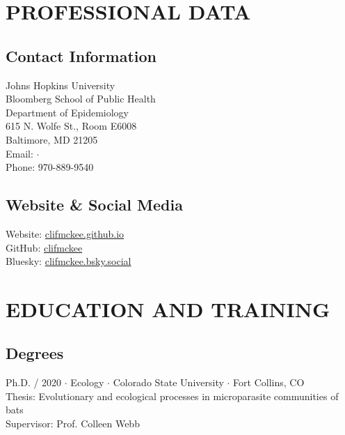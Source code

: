 \documentclass{cv}
\begin{document}


\section*{PROFESSIONAL DATA}

\subsection*{Contact Information}

Johns Hopkins University \\
Bloomberg School of Public Health \\
Department of Epidemiology \\
615 N. Wolfe St., Room E6008\\
Baltimore, MD 21205 \\
Email:  $\cdot$  \\
Phone: 970-889-9540

\subsection*{Website \& Social Media}

Website: \href{https://clifmckee.github.io/}{clifmckee.github.io} \\
GitHub: \href{https://github.com/clifmckee/}{clifmckee} \\
Bluesky: \href{https://bsky.app/profile/clifmckee.bsky.social}{clifmckee.bsky.social}


\section*{EDUCATION AND TRAINING}

\subsection*{Degrees}

Ph.D. / 2020 $\cdot$ Ecology $\cdot$ Colorado State University $\cdot$ Fort Collins, CO \\
Thesis: Evolutionary and ecological processes in microparasite communities of bats \\
Supervisor: Prof. Colleen Webb
\end{document}
